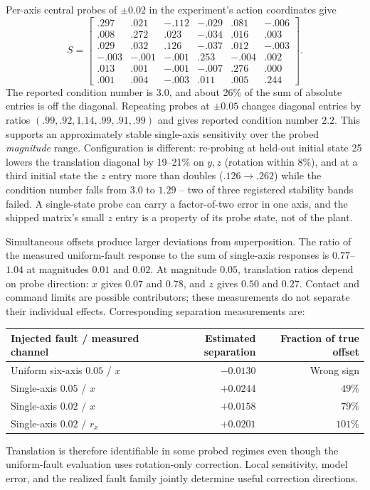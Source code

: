 Per-axis central probes of $\pm0.02$ in the experiment's action coordinates give
\begin{equation}
S=\begin{bmatrix}
 .297& .021&-.112&-.029& .081&-.006\\
 .008& .272& .023&-.034& .016& .003\\
 .029& .032& .126&-.037& .012&-.003\\
-.003&-.001&-.001& .253&-.004& .002\\
 .013& .001&-.001&-.007& .276& .000\\
 .001& .004&-.003& .011& .005& .244
\end{bmatrix}.
\end{equation}
The reported condition number is $3.0$, and about 26\% of the sum of absolute entries
is off the diagonal. Repeating probes at $\pm0.05$ changes diagonal entries by ratios
$(.99,.92,1.14,.99,.91,.99)$ and gives reported condition number $2.2$. This supports an approximately stable single-axis sensitivity over the
probed \emph{magnitude} range. Configuration is different: re-probing at
held-out initial state 25 lowers the translation diagonal by 19--21\% on
$y,z$ (rotation within 8\%), and at a third initial state the $z$ entry more
than doubles ($.126\to.262$) while the condition number falls from $3.0$ to
$1.29$ -- two of three registered stability bands failed. A single-state
probe can carry a factor-of-two error in one axis, and the shipped matrix's
small $z$ entry is a property of its probe state, not of the plant.

Simultaneous offsets produce larger deviations from superposition. The ratio of the
measured uniform-fault response to the sum of single-axis responses is $0.77$--$1.04$
at magnitudes $0.01$ and $0.02$. At magnitude $0.05$, translation ratios depend on
probe direction: $x$ gives $0.07$ and $0.78$, and $z$ gives $0.50$ and $0.27$.
Contact and command limits are possible contributors; these measurements do not
separate their individual effects. Corresponding separation measurements are:
\begin{center}\small
\begin{tabular}{lrr}
\toprule
Injected fault / measured channel & Estimated separation & Fraction of true offset\\
\midrule
Uniform six-axis $0.05$ / $x$ & $-0.0130$ & Wrong sign\\
Single-axis $0.05$ / $x$ & $+0.0244$ & $49\%$\\
Single-axis $0.02$ / $x$ & $+0.0158$ & $79\%$\\
Single-axis $0.02$ / $r_x$ & $+0.0201$ & $101\%$\\
\bottomrule
\end{tabular}
\end{center}
Translation is therefore identifiable in some probed regimes even though the
uniform-fault evaluation uses rotation-only correction. Local sensitivity, model
error, and the realized fault family jointly determine useful correction directions.

